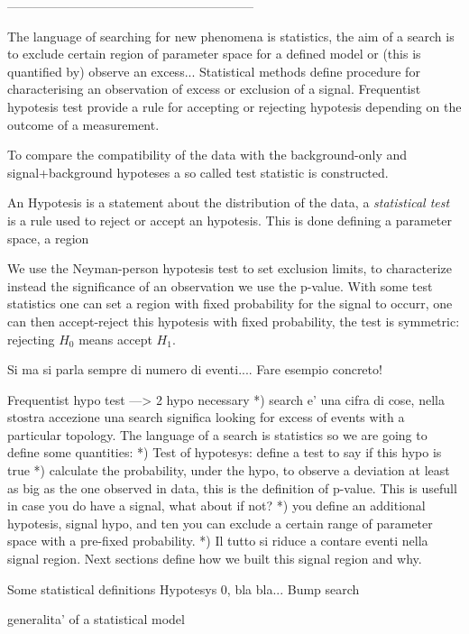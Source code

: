 -----------------------------------------------------------


The language of searching for new phenomena is statistics, the aim of a search is to exclude certain region of parameter space for a 
defined model or (this is quantified by) observe an excess... Statistical methods define procedure for characterising  
an observation of excess or exclusion of a signal.
Frequentist hypotesis test provide a rule for accepting or rejecting hypotesis depending on the outcome of a measurement.

To compare the compatibility of the data with the background-only and signal+background hypoteses a so called test statistic is constructed.

An Hypotesis is a statement about the distribution of the data, a \emph{statistical test} is a rule used to reject or accept an hypotesis.
This is done defining a parameter space, a region 

We use the Neyman-person hypotesis test to set exclusion limits, to characterize instead the significance of an observation we use the p-value.
With some test statistics one can set a region with fixed probability for the signal to occurr, one can then accept-reject this hypotesis with
fixed probability, the test is symmetric: rejecting $H_{0}$ means accept $H_{1}$.

Si ma si parla sempre di numero di eventi.... Fare esempio concreto!

Frequentist hypo test ---> 2 hypo necessary
*) search e' una cifra di cose, nella stostra accezione una search significa looking for excess of events with a particular topology.
The language of a search is statistics so we are going to define some quantities:
*) Test of hypotesys: define a test to say if this hypo is true
*) calculate the probability, under the hypo, to observe a deviation at least as big as the one observed in data, this is the definition of p-value.
This is usefull in case you do have a signal, what about if not?
*) you define an additional hypotesis, signal hypo, and ten you can exclude a certain range of parameter space with a pre-fixed probability.
*) Il tutto si riduce a contare eventi nella signal region. Next sections define how we built this signal region and why.

Some statistical definitions Hypotesys 0, bla bla...
Bump search

generalita' of a statistical model





